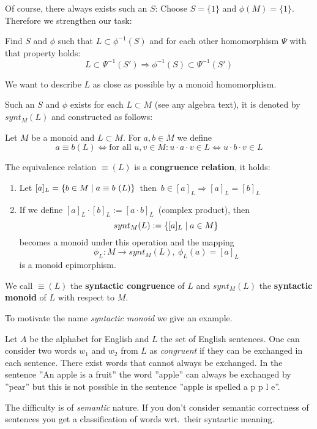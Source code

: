 Of course, there always exists such an $S$: Choose $S = \{ 1 \}$ and $\phi(M) =
\{1\}$. Therefore we strengthen our task: 

Find $S$ and $\phi$ such that $L \subset \phi^{-1}(S)$ and for each other
homomorphism $\Psi$ with that property holds:
\[ L \subset \Psi^{-1}(S') \Rightarrow \phi^{-1}(S) \subset \Psi^{-1}(S') \]

We want to describe $L$ as close as possible by a monoid homomorphism.

Such an $S$ and $\phi$ exists for each $L \subset M$ (see any algebra text), it
is denoted by $synt_M(L)$ and constructed as follows:

\begin{definition}
Let $M$ be a monoid and $L \subset M$. For $a, b \in M$ we define
\[ a \equiv b (L) \iff \text{for all }u, v \in M: u \cdot a \cdot v \in L
\Leftrightarrow u \cdot b \cdot v \in L \]
\end{definition}

The equivalence relation $\equiv (L)$ is a {\bf congruence relation}, it holds:
\begin{enumerate}
  \item Let $[a]_L = \mbox{$\{ b \in M \mid a \equiv b\ (L) \}$}$\ then\ $b \in
  [a]_L \Rightarrow [a]_L = [b]_L $
  \item If we define $[a]_L \cdot [b]_L := [a \cdot b]_L$\ (complex product),
  then \[synt_M(L) := \mbox{$\{[a]_L \mid a \in M\}$} \] becomes a monoid under
  this operation and the mapping \[\phi_L : M \to synt_M(L),\ \phi_L(a) = [a]_L\]
   is a monoid epimorphism.
\end{enumerate}

We call $\equiv (L)$ the {\bf syntactic congruence} of $L$ and $synt_M(L)$ the
{\bf syntactic monoid} of $L$ with respect to $M$.

To motivate the name {\em syntactic monoid} we give an example.

Let $A$ be the alphabet for English and $L$ the set of English sentences.
One can consider two words $w_1$ and $w_2$ from $L$ as {\em congruent} if they
can be exchanged in each sentence. There exist words that cannot always be exchanged. 
In the sentence ''An apple is a fruit'' the word ''apple'' can always be
exchanged by ''pear'' but this is not possible in the sentence ''apple is
spelled a p p l e''.

The difficulty is of {\em semantic} nature. If you don't consider semantic
correctness of sentences you get a classification of words wrt.\ their syntactic
meaning.

